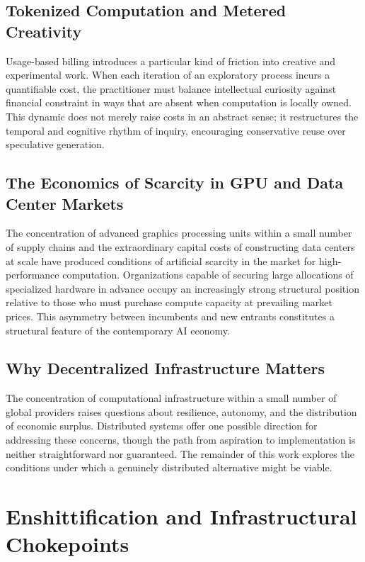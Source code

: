\documentclass[12pt]{book}
\theoremstyle{definition}
\theoremstyle{remark}
\begin{document}
\section{Tokenized Computation and Metered Creativity}

Usage-based billing introduces a particular kind of friction into
creative and experimental work. When each iteration of an exploratory
process incurs a quantifiable cost, the practitioner must balance
intellectual curiosity against financial constraint in ways that are
absent when computation is locally owned. This dynamic does not merely
raise costs in an abstract sense; it restructures the temporal and
cognitive rhythm of inquiry, encouraging conservative reuse over
speculative generation.

\section{The Economics of Scarcity in GPU and Data Center Markets}

The concentration of advanced graphics processing units within a
small number of supply chains and the extraordinary capital costs of
constructing data centers at scale have produced conditions of
artificial scarcity in the market for high-performance computation.
Organizations capable of securing large allocations of specialized
hardware in advance occupy an increasingly strong structural position
relative to those who must purchase compute capacity at prevailing
market prices. This asymmetry between incumbents and new entrants
constitutes a structural feature of the contemporary AI economy.

\section{Why Decentralized Infrastructure Matters}

The concentration of computational infrastructure within a small
number of global providers raises questions about resilience,
autonomy, and the distribution of economic surplus. Distributed
systems offer one possible direction for addressing these concerns,
though the path from aspiration to implementation is neither
straightforward nor guaranteed. The remainder of this work explores
the conditions under which a genuinely distributed alternative might
be viable.

\chapter{Enshittification and Infrastructural Chokepoints}
\end{document}
